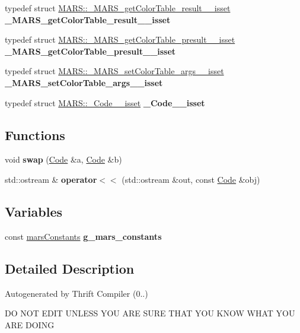 \begin{DoxyCompactItemize}
\item 
\mbox{\label{namespaceMARS_a5ccf813f4f09d921e5e08893ee2f38ab}} 
typedef struct \hyperlink{structMARS_1_1__MARS__getColorTable__result____isset}{M\+A\+R\+S\+::\+\_\+\+M\+A\+R\+S\+\_\+get\+Color\+Table\+\_\+result\+\_\+\+\_\+isset} {\bfseries \+\_\+\+M\+A\+R\+S\+\_\+get\+Color\+Table\+\_\+result\+\_\+\+\_\+isset}
\item 
\mbox{\label{namespaceMARS_aa001ef1cb24a81e69688d3ad32abefd1}} 
typedef struct \hyperlink{structMARS_1_1__MARS__getColorTable__presult____isset}{M\+A\+R\+S\+::\+\_\+\+M\+A\+R\+S\+\_\+get\+Color\+Table\+\_\+presult\+\_\+\+\_\+isset} {\bfseries \+\_\+\+M\+A\+R\+S\+\_\+get\+Color\+Table\+\_\+presult\+\_\+\+\_\+isset}
\item 
\mbox{\label{namespaceMARS_adafd083f1160e5e8f654003a45b2633c}} 
typedef struct \hyperlink{structMARS_1_1__MARS__setColorTable__args____isset}{M\+A\+R\+S\+::\+\_\+\+M\+A\+R\+S\+\_\+set\+Color\+Table\+\_\+args\+\_\+\+\_\+isset} {\bfseries \+\_\+\+M\+A\+R\+S\+\_\+set\+Color\+Table\+\_\+args\+\_\+\+\_\+isset}
\item 
\mbox{\label{namespaceMARS_a043c26ca4808e7927680997134f6d321}} 
typedef struct \hyperlink{structMARS_1_1__Code____isset}{M\+A\+R\+S\+::\+\_\+\+Code\+\_\+\+\_\+isset} {\bfseries \+\_\+\+Code\+\_\+\+\_\+isset}
\end{DoxyCompactItemize}
\subsection*{Functions}
\begin{DoxyCompactItemize}
\item 
\mbox{\label{namespaceMARS_aaebf7d6f392bc3f0fb96f102c08c883b}} 
void {\bfseries swap} (\hyperlink{classMARS_1_1Code}{Code} \&a, \hyperlink{classMARS_1_1Code}{Code} \&b)
\item 
\mbox{\label{namespaceMARS_a88ae3b19e28b9dcc7f83a1bc8e735b35}} 
std\+::ostream \& {\bfseries operator$<$$<$} (std\+::ostream \&out, const \hyperlink{classMARS_1_1Code}{Code} \&obj)
\end{DoxyCompactItemize}
\subsection*{Variables}
\begin{DoxyCompactItemize}
\item 
\mbox{\label{namespaceMARS_a3e9689f348fbbd83928cbc6bc22efcc6}} 
const \hyperlink{classMARS_1_1marsConstants}{mars\+Constants} {\bfseries g\+\_\+mars\+\_\+constants}
\end{DoxyCompactItemize}


\subsection{Detailed Description}
Autogenerated by Thrift Compiler (0..)

DO N\+OT E\+D\+IT U\+N\+L\+E\+SS Y\+OU A\+RE S\+U\+RE T\+H\+AT Y\+OU K\+N\+OW W\+H\+AT Y\+OU A\+RE D\+O\+I\+NG  